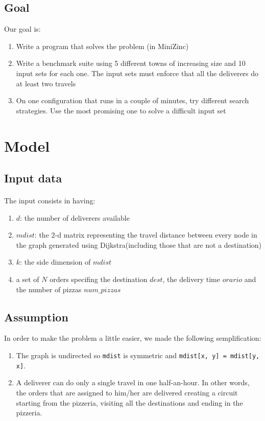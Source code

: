 \documentclass[10pt]{article}
\begin{document}
	\subsection{Goal}

	Our goal is:
	\begin{enumerate}
		\item Write a program that solves the problem (in MiniZinc)
		\item Write a benchmark suite using 5 different towns of increasing size
			and 10 input sets for each one. The input sets must enforce that all
			the deliverers do at least two travels
		\item On one configuration that runs in a couple of minutes, try
			different search strategies. Use the most promising one to solve a
			difficult input set
	\end{enumerate}

	\section{Model}
	\label{Model}

	
	\subsection{Input data}

	\paragraph*{}
	The input consists in having:
	\begin{enumerate}
		\item $d$: the number of deliverers available
		\item $mdist$: the 2-d matrix representing the travel distance between
			every node in the graph generated using Dijkstra(including those
			that are not a destination)
		\item $k$: the side dimension of $mdist$
		\item a set of $N$ orders specifing the destination $dest$, the delivery 
			time $orario$ and the number of pizzas $num\_pizzas$
	\end{enumerate}

	\subsection{Assumption}
	In order to make the problem a little easier, we made the following 
	semplification:
	\begin{enumerate}
		\item The graph is undirected so \texttt{mdist}	is symmetric and 
			\texttt{mdist[x, y] = mdist[y, x]}.
		\item A deliverer can do only a single travel in one half-an-hour. In other
			words, the orders that are assigned to him/her are delivered creating 
			a circuit starting from the pizzeria, visiting all the destinations 
			and ending in the pizzeria.
	\end{enumerate}
\end{document}
